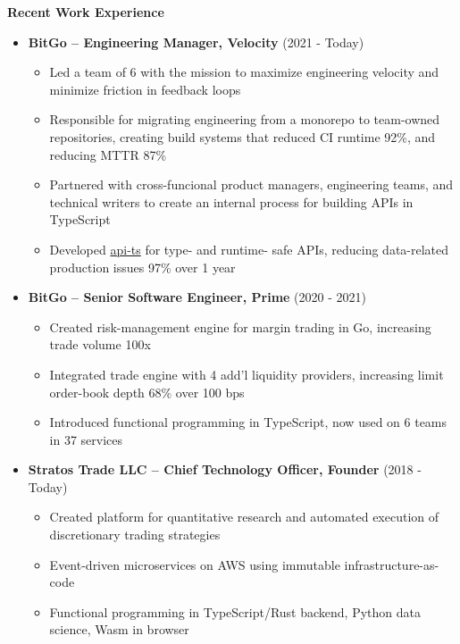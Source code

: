\documentclass{report}
\begin{document}
\textbf{Recent Work Experience}
\begin{itemize}[label=]

\item \textbf{BitGo -- Engineering Manager, Velocity} (2021 - Today)
  \begin{itemize}[label=$\circ$]
  \item Led a team of 6 with the mission to maximize engineering velocity and minimize friction in feedback loops
  \item Responsible for migrating engineering from a monorepo to team-owned repositories, creating build systems that reduced CI runtime 92\%, and reducing MTTR 87\%
  \item Partnered with cross-funcional product managers, engineering teams, and technical writers to create an internal process for building APIs in TypeScript
  \item Developed \href{https://github.com/BitGo/api-ts}{api-ts} for type- and runtime- safe APIs, reducing data-related production issues 97\% over 1 year
  \end{itemize}

\item \textbf{BitGo -- Senior Software Engineer, Prime} (2020 - 2021)
  \begin{itemize}[label=$\circ$]
  \item Created risk-management engine for margin trading in Go, increasing trade volume 100x
  \item Integrated trade engine with 4 add'l liquidity providers, increasing limit order-book depth 68\% over 100 bps
  \item Introduced functional programming in TypeScript, now used on 6 teams in 37 services
  \end{itemize}

\item \textbf{Stratos Trade LLC -- Chief Technology Officer, Founder} (2018 - Today)
  \begin{itemize}[label=$\circ$]
  \item Created platform for quantitative research and automated execution of discretionary trading strategies
  \item Event-driven microservices on AWS using immutable infrastructure-as-code
  \item Functional programming in TypeScript/Rust backend, Python data science, Wasm in browser
  \end{itemize}


\end{itemize}
\end{document}

